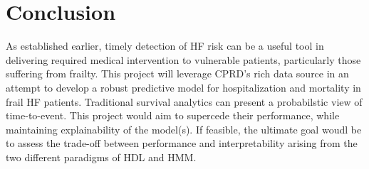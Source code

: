 \documentclass[%
 reprint,
 amsmath,amssymb,
 aps,
 nofootinbib,
]{revtex4-2}
\theoremstyle{definition}
\begin{document}
\section{\label{c}Conclusion}
As established earlier, timely detection of HF risk can be a useful tool in delivering required medical intervention to vulnerable patients, particularly those suffering from frailty. This project will leverage CPRD's rich data source in an attempt to develop a robust predictive model for hospitalization and mortality in frail HF patients. Traditional survival analytics can present a probabilstic view of time-to-event. This project would aim to supercede their performance, while maintaining explainability of the model(s). If feasible, the ultimate goal woudl be to assess the trade-off between performance and interpretability arising from the two different paradigms of HDL and HMM. 

\cite{*}

%
\end{document}

